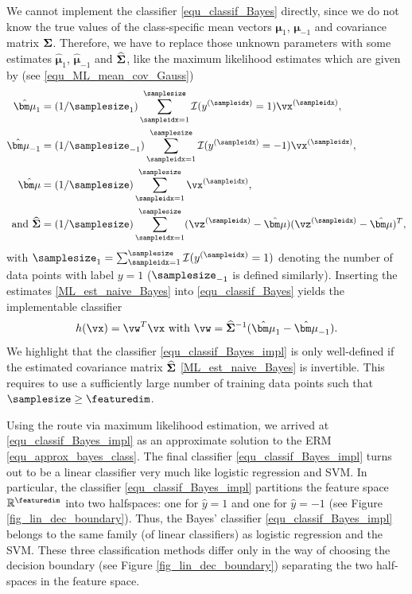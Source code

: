 \documentclass[12pt]{report}
\begin{document}
We cannot implement the classifier \eqref{equ_classif_Bayes} directly, since we do not know the 
true values of the class-specific mean vectors ${\bm \mu}_{1}$, ${\bm \mu}_{-1}$ and covariance 
matrix ${\bf \Sigma}$. Therefore, we have to replace those unknown parameters with some 
estimates $\hat{\bm \mu}_{1}$, $\hat{\bm \mu}_{-1}$ and $\widehat{\bf \Sigma}$, like the maximum 
likelihood estimates which are given by (see \eqref{equ_ML_mean_cov_Gauss}) 
\begin{align}
\hat{\bm \mu}_{1}  & = (1/\samplesize_{1}) \sum_{\sampleidx=1}^{\samplesize} \mathcal{I}(y^{(\sampleidx)}=1) \vx^{(\sampleidx)}, \nonumber \\
\hat{\bm \mu}_{-1}  & = (1/\samplesize_{-1}) \sum_{\sampleidx=1}^{\samplesize} \mathcal{I}(y^{(\sampleidx)}=-1) \vx^{(\sampleidx)}, \nonumber \\
\hat{\bm \mu} & =  (1/\samplesize) \sum_{\sampleidx=1}^{\samplesize} \vx^{(\sampleidx)}, \nonumber \\
 \mbox{and } \widehat{\bf \Sigma} & = (1/\samplesize) \sum_{\sampleidx=1}^{\samplesize} (\vz^{(\sampleidx)} - \hat{\bm \mu})(\vz^{(\sampleidx)} - \hat{\bm \mu})^{T}, \label{ML_est_naive_Bayes}
\end{align}
with $\samplesize_{1} = \sum_{\sampleidx=1}^{\samplesize}  \mathcal{I}(y^{(\sampleidx)}=1)$ 
denoting the number of data points with label $y=1$ ($\samplesize_{-1}$ is defined similarly). 
Inserting the estimates \eqref{ML_est_naive_Bayes} into \eqref{equ_classif_Bayes} yields the 
implementable classifier 
\begin{equation}
\label{equ_classif_Bayes_impl}
h(\vx) = \vw^{T} \vx \mbox{ with } \vw =  \widehat{\bf \Sigma}^{-1} (\hat{\bm \mu}_{1} - \hat{\bm \mu}_{-1}). 
\end{equation} 
We highlight that the classifier \eqref{equ_classif_Bayes_impl} is only well-defined if the estimated 
covariance matrix $\widehat{\bf \Sigma}$ \eqref{ML_est_naive_Bayes} is invertible. This requires 
to use a sufficiently large number of training data points such that $\samplesize \geq \featuredim$. 

Using the route via maximum likelihood estimation, we arrived at \eqref{equ_classif_Bayes_impl} 
as an approximate solution to the ERM \eqref{equ_approx_bayes_class}. The final classifier 
\eqref{equ_classif_Bayes_impl} turns out to be a linear classifier very much like logistic regression 
and SVM. In particular, the classifier \eqref{equ_classif_Bayes_impl} partitions the feature space 
$\mathbb{R}^{\featuredim}$ into two halfspaces: one for $\hat{y}=1$ and one for $\hat{y}=-1$ 
(see Figure \ref{fig_lin_dec_boundary}). Thus, the Bayes' classifier \eqref{equ_classif_Bayes_impl} 
belongs to the same family (of linear classifiers) as logistic regression and the SVM. 
These three classification methods differ only in the way of choosing the decision boundary 
(see Figure \ref{fig_lin_dec_boundary}) separating the two half-spaces in the feature space. 
\end{document}
